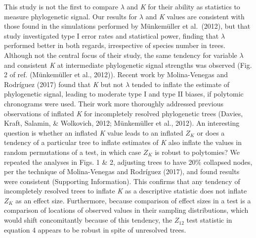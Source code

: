 \documentclass[
]{article}
\begin{document}
This study is not the first to compare \(\lambda\) and \emph{K} for
their ability as statistics to measure phylogenetic signal. Our results
for \(\lambda\) and \emph{K} values are consistent with those found in
the simulations performed by Münkemüller et al.~(2012), but that study
investigated type I error rates and statistical power, finding that
\(\lambda\) performed better in both regards, irrespective of species
number in trees. Although not the central focus of their study, the same
tendency for variable \(\lambda\) and consistent \emph{K} at
intermediate phylogenetic signal strengths was observed (Fig. 2 of ref.
(Münkemüller et al., 2012)). Recent work by Molina-Venegas and Rodríguez
(2017) found that \emph{K} but not \(\lambda\) tended to inflate the
estimate of phylogenetic signal, leading to moderate type I and type II
biases, if polytomic chronograms were used. Their work more thoroughly
addressed previous observations of inflated \emph{K} for incompletely
resolved phylogenetic trees (Davies, Kraft, Salamin, \& Wolkovich, 2012;
Münkemüller et al., 2012). An interesting question is whether an
inflated \emph{K} value leads to an inflated \(Z_K\) or does a tendency
of a particular tree to inflate estimates of \emph{K} also inflate the
values in random permutations of a test, in which case \(Z_K\) is robust
to polytomies? We repeated the analyses in Figs. 1 \& 2, adjusting trees
to have 20\% collapsed nodes, per the technique of Molina-Venegas and
Rodríguez (2017), and found results were consistent (Supporting
Information). This confirms that any tendency of incompletely resolved
trees to inflate \emph{K} as a descriptive statistic does not inflate
\(Z_K\) as an effect size. Furthermore, because comparison of effect
sizes in a test is a comparison of locations of observed values in their
sampling distributions, which would shift concomitantly because of this
tendency, the \(Z_{12}\) test statistic in equation 4 appears to be
robust in spite of unresolved trees. \hfill\break
\end{document}
